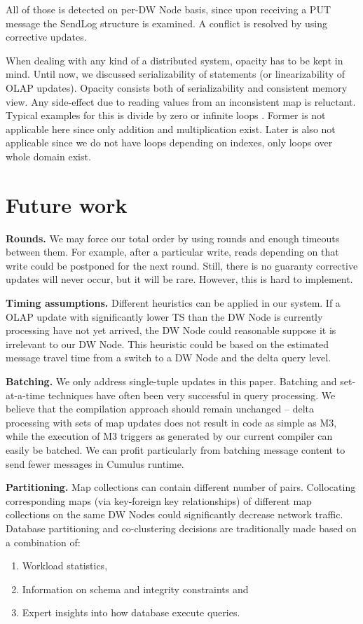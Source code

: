\documentclass{sig-semester}
\def\OLAP{OLAP\xspace}
\def\M3{M3\xspace}
\begin{document}
All of those is detected on per-DW Node basis, since upon receiving a PUT message the SendLog structure is examined. A conflict is resolved by using corrective updates.

When dealing with any kind of a distributed system, opacity has to be kept in mind. Until now, we discussed serializability of statements (or linearizability of \OLAP updates). Opacity consists both of serializability and consistent memory view. Any side-effect due to reading values from an inconsistent map is reluctant. Typical examples for this is divide by zero or infinite loops \cite{Rachid08}. Former is not applicable here since only addition and multiplication exist. Later is also not applicable since we do not have loops depending on indexes, only loops over whole domain exist.

\section{Future work}
\label{sec:Future}
\vspace{2mm}

\textbf{Rounds.} We may force our total order by using rounds and enough timeouts between them. For example, after a particular write, reads depending on that write could be postponed for the next round. Still, there is no guaranty corrective updates will never occur, but it will be rare. However, this is hard to implement.

\textbf{Timing assumptions.} Different heuristics can be applied in our system. If a \OLAP update with significantly lower TS than the DW Node is currently processing have not yet arrived, the DW Node could reasonable suppose it is irrelevant to our DW Node. This heuristic could be based on the estimated message travel time from a switch to a DW Node and the delta query level.

\textbf{Batching.} We only address single-tuple updates in this paper.
Batching and set-at-a-time techniques have often been
very successful in query processing.
We believe that the compilation approach
should remain unchanged -- delta processing with sets of map updates does not
result in code as simple as \M3, while the
execution of \M3 triggers as generated by our current compiler
can easily be batched. We can profit
particularly from batching message content to send fewer messages in
Cumulus runtime.

\textbf{Partitioning.}
Map collections can contain different number of pairs. Collocating corresponding maps (via key-foreign key relationships) of different map collections on the same DW Nodes could significantly decrease network traffic. Database partitioning and co-clustering decisions are traditionally made based on a combination of: 
\begin{enumerate}[(1)]
 \item Workload statistics, 
 \item Information on schema and integrity constraints and
 \item Expert insights into how database execute queries.
\end{enumerate}
\end{document}
